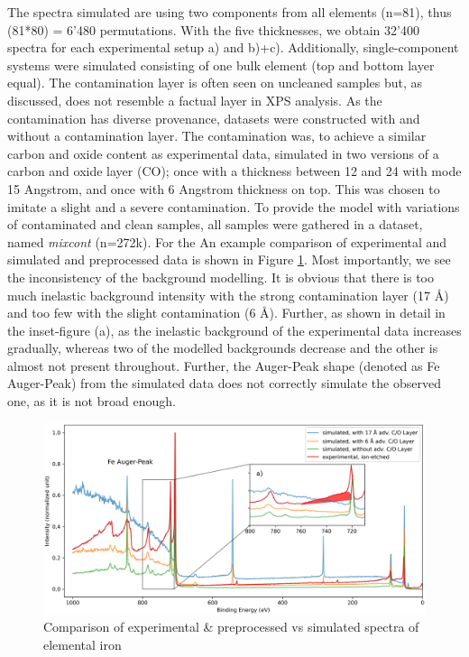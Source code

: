The spectra simulated are using two components from all elements (n=81), thus (81*80) = 6'480 permutations. With the five thicknesses, we obtain 32'400 spectra for each experimental setup a) and b)+c). Additionally, single-component systems were simulated consisting of one bulk element (top and bottom layer equal). The contamination layer is often seen on uncleaned samples but, as discussed, does not resemble a factual layer in XPS analysis. As the contamination has diverse provenance, datasets were constructed with and without a contamination layer. The contamination was, to achieve a similar carbon and oxide content as experimental data, simulated in two versions of a carbon and oxide layer (CO); once with a thickness between 12 and 24 with mode 15 Angstrom, and once with 6 Angstrom thickness on top. This was chosen to imitate a slight and a severe contamination. To provide the model with variations of contaminated and clean samples, all samples were gathered in a dataset, named \emph{mixcont} (n=272k). For the 
An example comparison of experimental and simulated and preprocessed data is shown in Figure \ref{fig:ex_vs_sim}. Most importantly, we see the inconsistency of the background modelling. It is obvious that there is too much inelastic background intensity with the strong contamination layer (17 Å) and too few with the slight contamination (6 Å). Further, as shown in detail in the inset-figure (a), as the inelastic background of the experimental data increases gradually, whereas two of the modelled backgrounds decrease and the other is almost not present throughout. Further, the Auger-Peak shape (denoted as Fe Auger-Peak) from the simulated data does not correctly simulate the observed one, as it is not broad enough.


\begin{figure}[H]
    \includegraphics[width=\textwidth]{Figures/Fe_XPS.png}
    \caption{Comparison of experimental \& preprocessed vs simulated spectra of elemental iron}
    \label{fig:ex_vs_sim}
    \centering
\end{figure}

